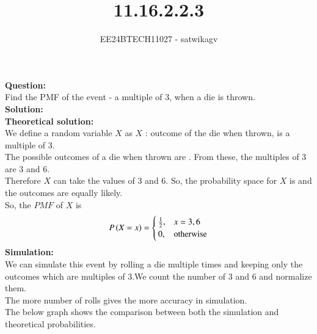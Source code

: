 \documentclass[journal]{IEEEtran}
\begin{document}

\vspace{3cm}

\title{11.16.2.2.3}
\author{EE24BTECH11027 - satwikagv}
{\let\newpage\relax\maketitle}

\renewcommand{\thefigure}{\theenumi}
\renewcommand{\thetable}{\theenumi}
\setlength{\intextsep}{10pt} %


\renewcommand{\thetable}{\theenumi}
\textbf{Question:}\\
Find the PMF of the event - a multiple of 3, when a die is thrown.\\ 
\textbf{Solution:}\\
\textbf{Theoretical solution:}\\
We define a random variable $X$ as $X$ : outcome of the die when thrown, is a multiple of 3.\\
The possible outcomes of a die when thrown are . From these, the multiples of 3 are 3 and 6.\\
Therefore $X$ can take the values of 3 and 6. So, the probability space for $X$ is  and the outcomes are equally likely.\\
So, the $PMF$ of $X$ is 
\begin{align}
    P\left(X=x\right)= \begin{cases}
        \frac{1}{2}, & x=3,6\\
        0, & \text{otherwise}
    \end{cases}
\end{align}
\textbf{Simulation:}\\
We can simulate this event by rolling a die multiple times and keeping only the outcomes which are multiples of 3.We count the number of 3 and 6 and normalize them.\\
The more number of rolls gives the more accuracy in simulation.\\
The below graph shows the comparison between both the simulation and theoretical probabilities.\\
\end{document}
